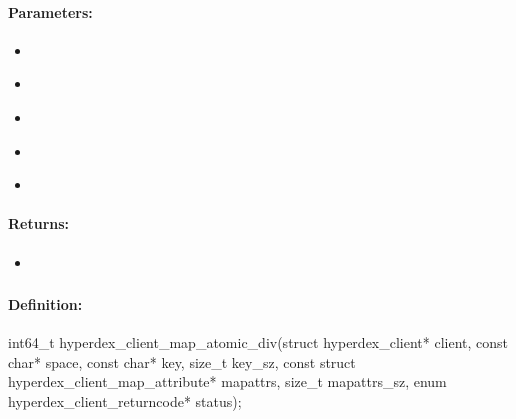 \paragraph{Parameters:}
\begin{itemize}[noitemsep]
\item {}\\

\item {}\\

\item {}\\

\item {}\\

\item {}\\

\end{itemize}

\paragraph{Returns:}
\begin{itemize}[noitemsep]
\item {}\\

\end{itemize}

\pagebreak
\subsubsection{}
\label{api:c:map_atomic_div}


\paragraph{Definition:}
\begin{ccode}
int64_t hyperdex_client_map_atomic_div(struct hyperdex_client* client,
        const char* space,
        const char* key, size_t key_sz,
        const struct hyperdex_client_map_attribute* mapattrs, size_t mapattrs_sz,
        enum hyperdex_client_returncode* status);
\end{ccode}

